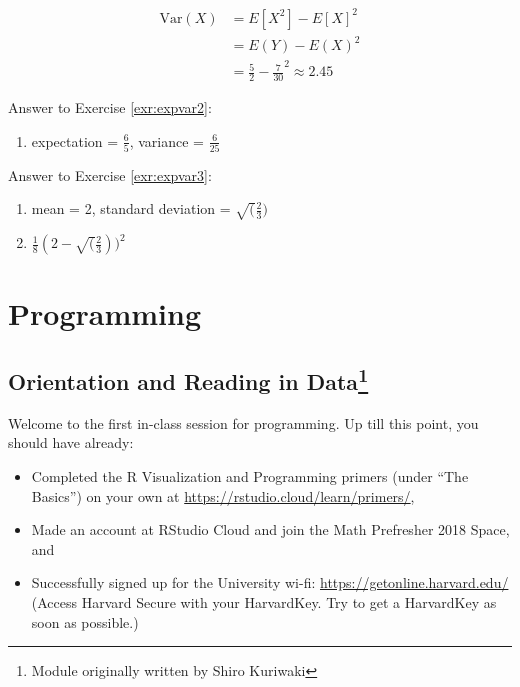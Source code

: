 \documentclass[]{book}
\providecommand{\tightlist}{%
  \setlength{\itemsep}{0pt}\setlength{\parskip}{0pt}}
\let\rmarkdownfootnote\footnote%
\def\footnote{\protect\rmarkdownfootnote}
\theoremstyle{definition}
\theoremstyle{definition}
\theoremstyle{definition}
\theoremstyle{remark}
\begin{document}
\begin{align*}
\text{Var}(X) &= E[X^2] - E[X]^2\\
&= E(Y) - E(X)^2\\
&= \frac{5}{2} - \frac{7}{30}^2 \approx 2.45
\end{align*}

Answer to Exercise \ref{exr:expvar2}:

\begin{enumerate}
\def\labelenumi{\arabic{enumi}.}
\tightlist
\item
  expectation = \(\frac{6}{5}\), variance = \(\frac{6}{25}\)
\end{enumerate}

Answer to Exercise \ref{exr:expvar3}:

\begin{enumerate}
\def\labelenumi{\arabic{enumi}.}
\item
  mean = 2, standard deviation = \(\sqrt(\frac{2}{3})\)
\item
  \(\frac{1}{8}(2 - \sqrt(\frac{2}{3}))^2\)
\end{enumerate}

\hypertarget{part-programming}{%
\part{Programming}\label{part-programming}}

\hypertarget{dataimport}{%
\chapter[Orientation and Reading in Data]{\texorpdfstring{Orientation and Reading in Data\footnote{Module originally written by Shiro Kuriwaki}}{Orientation and Reading in Data}}\label{dataimport}}

Welcome to the first in-class session for programming. Up till this point, you should have already:

\begin{itemize}
\tightlist
\item
  Completed the R Visualization and Programming primers (under ``The Basics'') on your own at \url{https://rstudio.cloud/learn/primers/},
\item
  Made an account at RStudio Cloud and join the Math Prefresher 2018 Space, and
\item
  Successfully signed up for the University wi-fi: \url{https://getonline.harvard.edu/} (Access Harvard Secure with your HarvardKey. Try to get a HarvardKey as soon as possible.)
\end{itemize}
\end{document}
